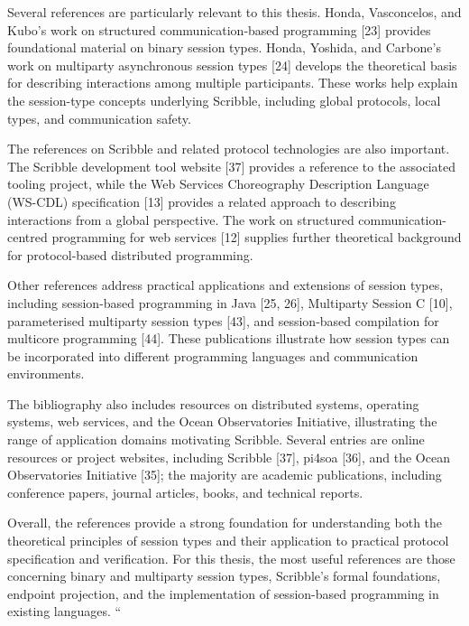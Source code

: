 Several references are particularly relevant to this thesis. Honda, Vasconcelos, and Kubo's work on structured communication-based programming [23] provides foundational material on binary session types. Honda, Yoshida, and Carbone's work on multiparty asynchronous session types [24] develops the theoretical basis for describing interactions among multiple participants. These works help explain the session-type concepts underlying Scribble, including global protocols, local types, and communication safety.

The references on Scribble and related protocol technologies are also important. The Scribble development tool website [37] provides a reference to the associated tooling project, while the Web Services Choreography Description Language (WS-CDL) specification [13] provides a related approach to describing interactions from a global perspective. The work on structured communication-centred programming for web services [12] supplies further theoretical background for protocol-based distributed programming.

Other references address practical applications and extensions of session types, including session-based programming in Java [25, 26], Multiparty Session C [10], parameterised multiparty session types [43], and session-based compilation for multicore programming [44]. These publications illustrate how session types can be incorporated into different programming languages and communication environments.

The bibliography also includes resources on distributed systems, operating systems, web services, and the Ocean Observatories Initiative, illustrating the range of application domains motivating Scribble. Several entries are online resources or project websites, including Scribble [37], pi4soa [36], and the Ocean Observatories Initiative [35]; the majority are academic publications, including conference papers, journal articles, books, and technical reports.

Overall, the references provide a strong foundation for understanding both the theoretical principles of session types and their application to practical protocol specification and verification. For this thesis, the most useful references are those concerning binary and multiparty session types, Scribble's formal foundations, endpoint projection, and the implementation of session-based programming in existing languages.
``


